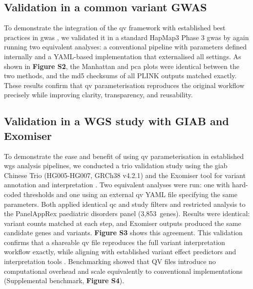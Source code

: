 \documentclass[unnumsec,webpdf,contemporary,large,namedate]{oup-authoring-template}
\begin{document}
\subsection{Validation in a common variant GWAS}
To demonstrate the integration of the \ac{qv} framework with established best practices in \ac{gwas} \citep{2021uffelmannGenomewideAssociationStudies}, we validated it in a standard HapMap3 Phase 3 \ac{gwas} by again running two equivalent analyses: a conventional pipeline with parameters defined internally and a YAML-based implementation that externalised all settings.
As shown in 
\textbf{Figure S2},
the Manhattan and \ac{pca} plots were identical between the two methods, and the \ac{md5} checksums of all PLINK outputs matched exactly. These results confirm that \ac{qv} parameterisation reproduces the original workflow precisely while improving clarity, transparency, and reusability.

\subsection{Validation in a WGS study with GIAB and Exomiser}
To demonstrate the ease and benefit of using \ac{qv} parameterisation in established \ac{wgs} analysis pipelines, we conducted a trio validation study using the \ac{giab} Chinese Trio (HG005-HG007, GRCh38 v4.2.1) and the Exomiser tool for variant annotation and interpretation \citep{2020ciprianiImprovedPhenotypeDrivenTool}. 
Two equivalent analyses were run: one with hard-coded thresholds and one using an external \ac{qv} YAML file specifying the same parameters. Both applied identical \ac{qc} and study filters and restricted analysis to the PanelAppRex paediatric disorders panel (3{,}853~genes). Results were identical: variant counts matched at each step, and Exomiser outputs produced the same candidate genes and variants.
\textbf{Figure S3}  
shows this agreement.
This validation confirms that a shareable \ac{qv} file reproduces the full variant interpretation workflow exactly, while aligning with established variant effect predictors and interpretation tools \citep{2024riccioVariantEffectPredictors, 2020ciprianiImprovedPhenotypeDrivenTool, 2020holtgreweVarFishComprehensiveDNA}.
Benchmarking showed that QV files introduce no computational overhead and scale equivalently to conventional implementations 
(Supplemental benchmark,
\textbf{Figure S4}).
\end{document}
